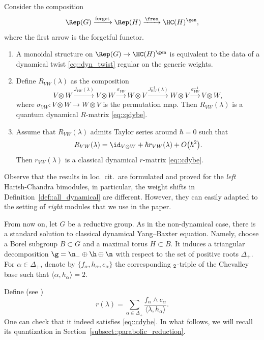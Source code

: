 	\begin{Theorem}
		\label{thm::dynamical_tannakian}
		Consider the composition
		\[
		\Rep(G) \xrightarrow{\mathrm{forget}} \Rep(H) \xrightarrow{\free} \HC(H)^{\gen},
		\]
		where the first arrow is the forgetful functor.
		\begin{enumerate}\itemsep=0pt
			\item[$(1)$] A monoidal structure on $\Rep(G) \rightarrow \HC(H)^{\gen}$ is equivalent to the data of a dynamical twist \eqref{eq::dyn_twist} regular on the generic weights.
			\item[$(2)$] Define $R_{VW}(\lambda)$ as the composition
			\[
			V\otimes W \xrightarrow{J_{VW}(\lambda)} V \otimes W \xrightarrow{\sigma_{VW}} W \otimes V \xrightarrow{J_{WV}^{-1}(\lambda)} W \otimes V \xrightarrow{\sigma_{VW}^{-1}} V \otimes W,
			\]
			where $\sigma_{VW} \colon V \otimes W \rightarrow W \otimes V$ is the permutation map. Then $R_{VW}(\lambda)$ is a quantum dynamical $R$-matrix \eqref{eq::qdybe}.
			\item[$(3)$] Assume that $R_{VW}(\lambda)$ admits Taylor series around $\hbar=0$ such that
			\[R_{VW} (\lambda)= \id_{V \otimes W} + \hbar r_{VW}(\lambda) + O\bigl(\hbar^2\bigr). \]
			Then $r_{VW}(\lambda)$ is a classical dynamical $r$-matrix \eqref{eq::cdybe}.
		\end{enumerate}
	\end{Theorem}
	
	\begin{Remark}
		Observe that the results in loc.\ cit.\  are formulated and proved for the \emph{left} Harish-Chandra bimodules, in particular, the weight shifts in Definition~\ref{def::all_dynamical} are different. However, they can easily adapted to the setting of \emph{right} modules that we use in the paper.
	\end{Remark}
	
	
	From now on, let $G$ be a reductive group. As in the non-dynamical case, there is a standard solution to classical dynamical Yang--Baxter equation. Namely, choose a Borel subgroup $B\subset G$ and a maximal torus $H \subset B$. It induces a triangular decomposition $\g = \n_- \oplus \h \oplus \n$ with respect to the set of positive roots $\Delta_+$. For $\alpha\in \Delta_+$, denote by $\{f_{\alpha}, h_{\alpha}, e_{\alpha}\}$ the corresponding $\sl_2$-triple of the Chevalley base such that $\langle \alpha,h_{\alpha} \rangle =2$.
	
	Define (see \cite{EtingofVarchenkoExchange})
	\begin{equation}
		\label{eq::standard_sol_cdybe}
		r(\lambda) = \sum_{\alpha \in \Delta_+} \frac{f_{\alpha} \wedge e_{\alpha}}{\langle\lambda,h_{\alpha} \rangle }.
	\end{equation}
	One can check that it indeed satisfies \eqref{eq::cdybe}. In what follows, we will recall its quantization in Section~\ref{subsect::parabolic_reduction}.
	
